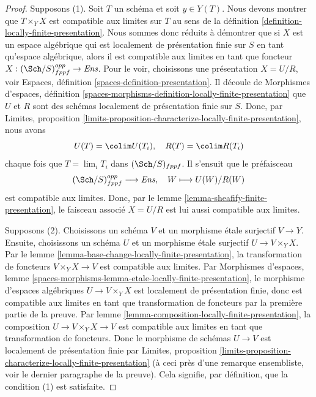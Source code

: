 \begin{proof}
Supposons (1). Soit $T$ un schéma et soit $y \in Y(T)$. Nous devons montrer que
$T \times_Y X$ est compatible aux limites sur $T$ au sens de
la définition \ref{definition-locally-finite-presentation}.
Nous sommes donc réduits à démontrer que si $X$ est un espace algébrique qui
est localement de présentation finie sur $S$ en tant qu'espace algébrique, alors il
est compatible aux limites en tant que foncteur
$X : (\Sch/S)_{fppf}^{opp} \to \textit{Ens}$.
Pour le voir, choisissons une présentation $X = U/R$, voir
Espaces, définition \ref{spaces-definition-presentation}.
Il découle de
Morphismes d'espaces,
définition \ref{spaces-morphisms-definition-locally-finite-presentation}
que $U$ et $R$ sont des schémas localement de présentation finie
sur $S$. Donc, par
Limites, proposition
\ref{limits-proposition-characterize-locally-finite-presentation},
nous avons
$$
U(T) = \colim U(T_i), \quad
R(T) = \colim R(T_i)
$$
chaque fois que $T = \lim_i T_i$ dans $(\Sch/S)_{fppf}$. Il s'ensuit
que le préfaisceau
$$
(\Sch/S)_{fppf}^{opp} \longrightarrow \textit{Ens}, \quad
W \longmapsto U(W)/R(W)
$$
est compatible aux limites. Donc, par le
lemme \ref{lemma-sheafify-finite-presentation},
le faisceau associé $X = U/R$ est lui aussi compatible aux limites.

\medskip\noindent
Supposons (2). Choisissons un schéma $V$ et un morphisme \'etale surjectif
$V \to Y$. Ensuite, choisissons un schéma $U$ et un morphisme \'etale surjectif
$U \to V \times_Y X$. Par le
lemme \ref{lemma-base-change-locally-finite-presentation}, la transformation de foncteurs
$V \times_Y X \to V$ est compatible aux limites. Par
Morphismes d'espaces,
lemme \ref{spaces-morphisms-lemma-etale-locally-finite-presentation},
le morphisme d'espaces algébriques $U \to V \times_Y X$ est localement
de présentation finie, donc est compatible aux limites en tant que
transformation de foncteurs par la première partie de la preuve. Par
lemme \ref{lemma-composition-locally-finite-presentation},
la composition $U \to V \times_Y X \to V$ est compatible aux limites
en tant que transformation de foncteurs. Donc
le morphisme de schémas $U \to V$ est localement de présentation finie par
Limites, proposition
\ref{limits-proposition-characterize-locally-finite-presentation}
(à ceci près d'une remarque ensembliste, voir le dernier paragraphe de la preuve).
Cela signifie, par définition, que la condition (1) est satisfaite.


\end{proof}
